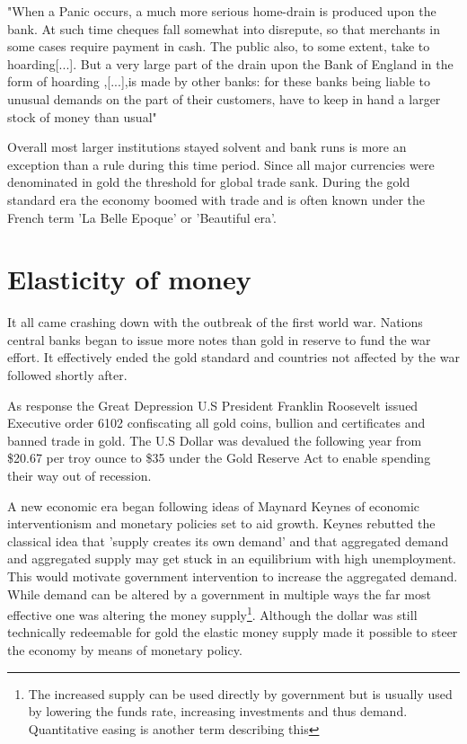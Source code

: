 \begin{displayquote}
	"When a Panic occurs, a much more serious home-drain is produced upon the bank. At such time cheques fall somewhat into disrepute, so that merchants in some cases require payment in cash. The public also, to some extent, take to hoarding[...]. But a very large part of the drain upon the Bank of England in the form of hoarding ,[...],is made by other banks: for these banks being liable to unusual demands on the part of their customers, have to keep in hand a larger stock of money than usual"\cite{patterson:monetary:drains}
\end{displayquote}

Overall most larger institutions stayed solvent and bank runs is more an exception than a rule during this time period. Since all major currencies were denominated in gold the threshold for global trade sank. During the gold standard era the economy boomed with trade and is often known under the French term 'La Belle Epoque' or 'Beautiful era'. 

\onecolumn

\section{Elasticity of money}

It all came crashing down with the outbreak of the first world war. Nations central banks began to issue more notes than gold in reserve to fund the war effort. It effectively ended the gold standard and countries not affected by the war followed shortly after.

As response the Great Depression U.S President Franklin Roosevelt issued Executive order 6102 confiscating all gold coins, bullion and certificates and banned trade in gold\cite{roosevelt:6102}. The U.S Dollar was devalued the following year from \$20.67 per troy ounce to \$35 under the Gold Reserve Act\cite{gold:reserve:act} to enable spending their way out of recession. 

A new economic era began following ideas of Maynard Keynes of economic interventionism and monetary policies set to aid growth. Keynes rebutted the classical idea that 'supply creates its own demand' and that aggregated demand and aggregated supply may get stuck in an equilibrium with high unemployment\cite{keynes:general:theory}. This would motivate government intervention to increase the aggregated demand. While demand can be altered by a government in multiple ways the far most effective one was altering the money supply\footnote{The increased supply can be used directly by government but is usually used by lowering the funds rate, increasing investments and thus demand. Quantitative easing is another term describing this }. Although the dollar was still technically redeemable for gold the elastic money supply made it possible to steer the economy by means of monetary policy. 

